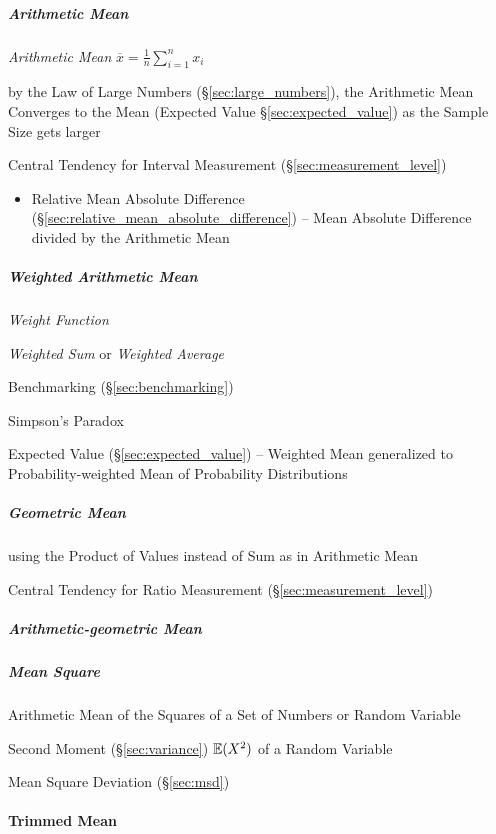 
\subparagraph{Arithmetic Mean}\label{sec:arithmetic_mean}\hfill

\emph{Arithmetic Mean} $\overline{x} = \frac{1}{n}\sum_{i=1}^n x_i$

by the Law of Large Numbers (\S\ref{sec:large_numbers}), the Arithmetic Mean
Converges to the Mean (Expected Value \S\ref{sec:expected_value}) as the Sample
Size gets larger

Central Tendency for Interval Measurement (\S\ref{sec:measurement_level})

\begin{itemize}
  \item Relative Mean Absolute Difference
    (\S\ref{sec:relative_mean_absolute_difference}) -- Mean Absolute Difference
    divided by the Arithmetic Mean
\end{itemize}



\subparagraph{Weighted Arithmetic Mean}\label{sec:weighted_mean}\hfill

\emph{Weight Function}

\emph{Weighted Sum} or \emph{Weighted Average}

\fist Benchmarking (\S\ref{sec:benchmarking})

Simpson's Paradox

\fist Expected Value (\S\ref{sec:expected_value}) -- Weighted Mean generalized
to Probability-weighted Mean of Probability Distributions



\subparagraph{Geometric Mean}\label{sec:geometric_mean}\hfill

using the Product of Values instead of Sum as in Arithmetic Mean

Central Tendency for Ratio Measurement (\S\ref{sec:measurement_level})



\subparagraph{Arithmetic-geometric Mean}\label{sec:arithmetic_geometric}\hfill

\subparagraph{Mean Square}\label{sec:mean_square}\hfill

Arithmetic Mean of the Squares of a Set of Numbers or Random Variable

Second Moment (\S\ref{sec:variance}) $\mathbb{E}(X^2)$ of a Random Variable

\fist Mean Square Deviation (\S\ref{sec:msd})



\paragraph{Trimmed Mean}\label{sec:trimmed_mean}\hfill



